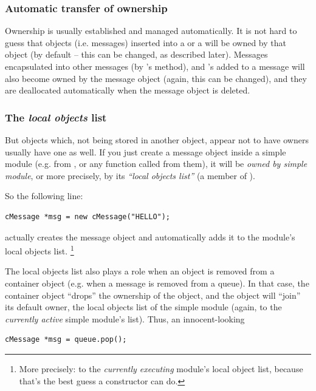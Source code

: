 \subsubsection{Automatic transfer of ownership}

Ownership is usually established and managed automatically.
It is not hard to guess that objects (i.e. messages) inserted
into a  or a  will be owned by that object
(by default -- this can be changed, as described later).
Messages encapsulated into other messages (by 's
 method), and 's added to a message
will also become owned by the message object (again, this can be
changed), and they are deallocated automatically when the
message object is deleted.

\subsubsection{The \textit{local objects} list}

But objects which, not being stored in another object, appear not to
have owners usually have one as well. If you just create a
message object inside a simple module (e.g. from ,
 or any function called from them), it will
be \textit{owned by simple module}, or more precisely, by
its \textit{``local objects list''} (a member of ).

So the following line:

\begin{verbatim}
cMessage *msg = new cMessage("HELLO");
\end{verbatim}

actually creates the message object and automatically adds it
to the module's local objects list.
  \footnote{More precisely: to the \textit{currently executing} module's
  local object list, because that's the best guess a 
  constructor can do.}

The local objects list also plays a role when an object is
removed from a container object (e.g. when a message is removed
from a queue).
In that case, the container object ``drops'' the ownership of the
object, and the object will ``join'' its default owner,
the local objects list of the simple module (again, to the
\textit{currently active} simple module's list).
Thus, an innocent-looking

\begin{verbatim}
cMessage *msg = queue.pop();
\end{verbatim}

